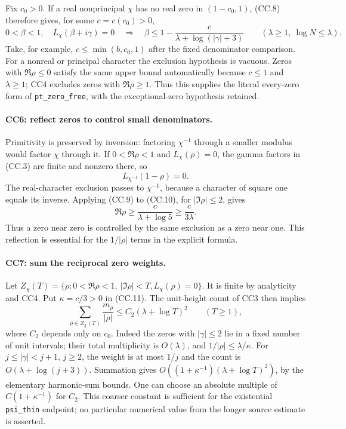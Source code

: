 Fix $c_0>0$. If a real nonprincipal $\chi$ has no real zero in
$(1-c_0,1)$, (CC.8) therefore gives, for some $c=c(c_0)>0$,
\[
 0<\beta<1,\quad L_\chi(\beta+i\gamma)=0
 \quad\Longrightarrow\quad
       \beta\le1-\frac{c}{\lambda+\log(|\gamma|+3)}
 \qquad(\lambda\ge1,\ \log N\le\lambda).               \tag{CC.9}
\]
Take, for example, $c\le\min(b,c_0,1)$ after the fixed denominator
comparison. For a nonreal or principal character the exclusion
hypothesis is vacuous. Zeros with $\Re\rho\le0$ satisfy the same
upper bound automatically because $c\le1$ and $\lambda\ge1$;
CC4 excludes zeros with $\Re\rho\ge1$. Thus this supplies the
literal every-zero form of \texttt{pt\_zero\_free}, with the
exceptional-zero hypothesis retained.

\paragraph{CC6: reflect zeros to control small denominators.}
Primitivity is preserved by inversion: factoring $\chi^{-1}$
through a smaller modulus would factor $\chi$ through it.
If $0<\Re\rho<1$ and $L_\chi(\rho)=0$, the gamma factors in
(CC.3) are finite and nonzero there, so
\[
                     L_{\chi^{-1}}(1-\rho)=0.           \tag{CC.10}
\]
The real-character exclusion passes to $\chi^{-1}$, because
a character of square one equals its inverse. Applying (CC.9)
to (CC.10), for $|\Im\rho|\le2$, gives
\[
          \Re\rho\ge\frac{c}{\lambda+\log5}
                         \ge\frac{c}{3\lambda}.         \tag{CC.11}
\]
Thus a zero near zero is controlled by the same exclusion as
a zero near one. This reflection is essential for the
$1/|\rho|$ terms in the explicit formula.

\paragraph{CC7: sum the reciprocal zero weights.}
Let $Z_\chi(T)=\{\rho:0<\Re\rho<1,\ |\Im\rho|<T,
L_\chi(\rho)=0\}$. It is finite by analyticity and CC4.
Put $\kappa=c/3>0$ in (CC.11).
The unit-height count of CC3 then implies
\[
 \sum_{\rho\in Z_\chi(T)}\frac{m_\rho}{|\rho|}
          \le C_2(\lambda+\log T)^2\qquad(T\ge1),       \tag{CC.12}
\]
where $C_2$ depends only on $c_0$.
Indeed the zeros with $|\gamma|\le2$ lie in a fixed number
of unit intervals; their total multiplicity is $O(\lambda)$,
and $1/|\rho|\le\lambda/\kappa$. For $j\le|\gamma|<j+1$,
$j\ge2$, the weight is at most $1/j$ and the count is
$O(\lambda+\log(j+3))$. Summation gives
$O((1+\kappa^{-1})(\lambda+\log T)^2)$, by the elementary
harmonic-sum bounds. One can choose an absolute multiple of
$C(1+\kappa^{-1})$ for $C_2$. This coarser constant is sufficient
for the existential \texttt{psi\_thin} endpoint; no particular
numerical value from the longer source estimate is asserted.

